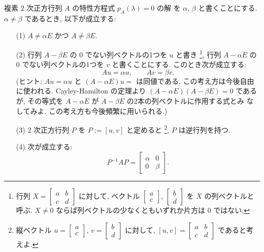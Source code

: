 \documentclass[12pt,twoside]{jarticle}
\begin{document}
\begin{question}[10点]
  \label{q:normal-form-2.1}
  複素 $2$ 次正方行列 $A$ の特性方程式 $p_A(\lambda)=0$ の解
  を $\alpha$, $\beta$ と書くことにする. 
  $\alpha \ne \beta$ であるとき, 以下が成立する:
  \begin{enumerate}
  \item[(1)] $A \ne \alpha E$ かつ $A \ne \beta E$.
  \item[(2)] 行列 $A - \beta E$ の $0$ でない列ベクトルの1つを $u$ と書き%
    \footnote{行列 $X=\begin{bmatrix}a&b\\c&d\end{bmatrix}$ に対して, 
      ベクトル $\begin{bmatrix}a\\c\end{bmatrix}$,
      $\begin{bmatrix}b\\d\end{bmatrix}$ を $X$ の列ベクトルと呼ぶ.
      $X \ne 0$ ならば列ベクトルの少なくともいずれか片方は $0$ ではない.}, %
    行列 $A - \alpha E$ の $0$ でない列ベクトルの1つを $v$ と書くことにする. 
    このとき次が成立する:
    \begin{equation*}
      Au = \alpha u,  \qquad  Av = \beta v.
    \end{equation*}
    (ヒント: $Au=\alpha u$ と $(A-\alpha E)u=$ は同値である.
    この考え方は今後自由に使われる. 
    Cayley-Hamilton の定理より $(A-\alpha E)(A-\beta E)=0$ であるが, 
    その等式を $A-\alpha E$ が $A-\beta E$ の2本の列ベクトルに作用する式とみ
    なしてみよ.  この考え方も今後頻繁に用いられる.)
  \item[(3)] $2$ 次正方行列 $P$ を $P := [u, v]$ と定めると%
    \footnote{縦ベクトル $u=\begin{bmatrix}a\\c\end{bmatrix}$, 
      $v=\begin{bmatrix}b\\d\end{bmatrix}$ に対して, 
      $[u, v] = \begin{bmatrix}a&b\\c&d\end{bmatrix}$ であると考えよ.}, %
    $P$ は逆行列を持つ. 
  \item[(4)] 次が成立する:
    \begin{equation*}
      P^{-1} A P = \begin{bmatrix}\alpha & 0\\0 & \beta\end{bmatrix}.

\end{equation*}
\end{enumerate}
\end{question}
\end{document}

